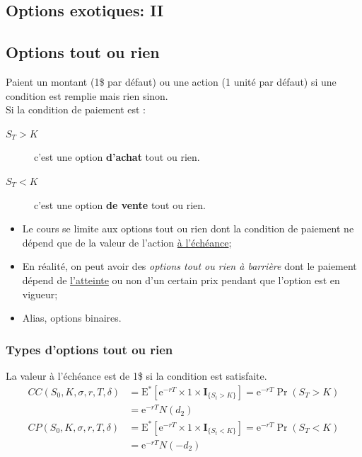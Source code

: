 \documentclass[10pt, french]{article}
\begin{document}
\begin{multicols*}{2}
\pagebreak
\setcounter{section}{22}
\section{Options exotiques: II}
\subsection{Options tout ou rien}

\begin{definitionNOHFILL}
Paient un montant (1\$ par défaut) ou une action (1 unité par défaut) si une condition est remplie mais rien sinon.\\

Si la condition de paiement est :
\begin{description}
	\item[$S_{T}	>	K$] c'est une option \textbf{d'achat} tout ou rien.
	\item[$S_{T}	<	K$]	c'est une option \textbf{de vente} tout ou rien.
\end{description}

\tcbline

\begin{itemize}[leftmargin = *]
	\item	Le cours se limite aux options tout ou rien dont la condition de paiement ne dépend que de la valeur de l'action \underline{à l'échéance};
	\item	En réalité, on peut avoir des \textit{options tout ou rien à barrière} dont le paiement dépend de \underline{l'atteinte} ou non d'un certain prix pendant que l'option est en vigueur;
	\item	Alias, options binaires.
\end{itemize}
\end{definitionNOHFILL}


\subsubsection{Types d'options tout ou rien}
\begin{definitionNOHFILLsub}
La valeur à l'échéance est de 1\$ si la condition est satisfaite.\\

\begin{align*}
	CC(S_{0}, K, \sigma, r, T, \delta)
	&=	\text{E}^{*}[\textrm{e}^{-rT} \times 1	\times	\bm{I}_{\{S_{t}	>	K\}}]
	=	\textrm{e}^{-rT} \Pr(S_{T}	>	K)	\\
	&=	\textrm{e}^{-rT} N(d_{2})	\\
	CP(S_{0}, K, \sigma, r, T, \delta)
	&=	\text{E}^{*}[\textrm{e}^{-rT} \times	1	\times	\bm{I}_{\{S_{t}	<	K\}}]
	=	\textrm{e}^{-rT} \Pr(S_{T}	<	K)	\\
	&=	\textrm{e}^{-rT} N(-d_{2})	
\end{align*}
\end{definitionNOHFILLsub}


\end{multicols*}
\end{document}
